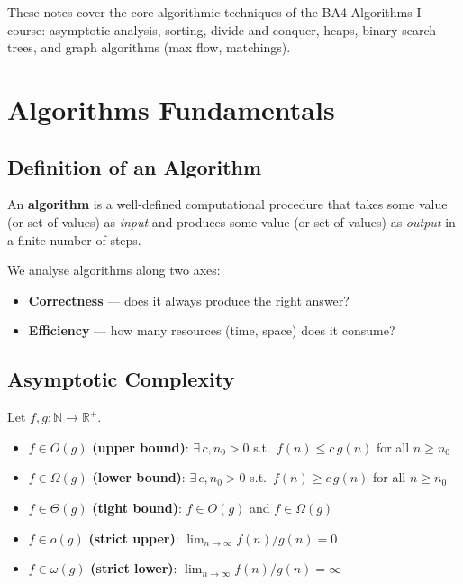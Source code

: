 \documentclass[11pt,a4paper,openany]{book}
\begin{document}
\raggedbottom


\tableofcontents
\clearpage

These notes cover the core algorithmic techniques of the BA4 Algorithms I course:
asymptotic analysis, sorting, divide-and-conquer, heaps, binary search trees, and
graph algorithms (max flow, matchings).

\chapter{Algorithms Fundamentals}

\section{Definition of an Algorithm}
\begin{defnbox}
An \textbf{algorithm} is a well-defined computational procedure that takes some value (or
set of values) as \emph{input} and produces some value (or set of values) as \emph{output}
in a finite number of steps.
\end{defnbox}

We analyse algorithms along two axes:
\begin{itemize}
  \item \textbf{Correctness} — does it always produce the right answer?
  \item \textbf{Efficiency} — how many resources (time, space) does it consume?
\end{itemize}

\section{Asymptotic Complexity}

\begin{defnbox}[title=Asymptotic notations]
Let $f, g : \mathbb{N} \to \mathbb{R}^+$.
\begin{itemize}
  \item $f \in O(g)$ \textbf{(upper bound)}: $\exists\, c, n_0 > 0$ s.t.\ $f(n) \leq c\,g(n)$ for all $n \geq n_0$
  \item $f \in \Omega(g)$ \textbf{(lower bound)}: $\exists\, c, n_0 > 0$ s.t.\ $f(n) \geq c\,g(n)$ for all $n \geq n_0$
  \item $f \in \Theta(g)$ \textbf{(tight bound)}: $f \in O(g)$ and $f \in \Omega(g)$
  \item $f \in o(g)$ \textbf{(strict upper)}: $\lim_{n\to\infty} f(n)/g(n) = 0$
  \item $f \in \omega(g)$ \textbf{(strict lower)}: $\lim_{n\to\infty} f(n)/g(n) = \infty$
\end{itemize}
\end{defnbox}
\end{document}
